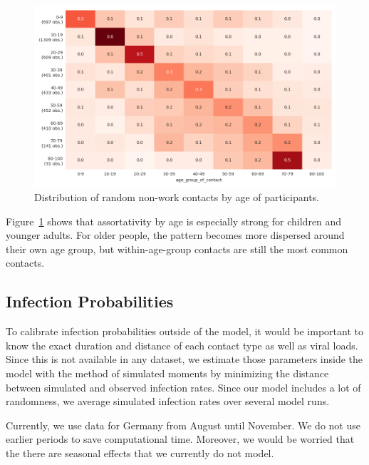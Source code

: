 \begin{figure}[ht]
    \centering
    \includegraphics[width=0.9 \textwidth]{../figures/assortative_matching_probability_example.png}
    \caption{Distribution of random non-work contacts by age of participants.}
    \label{fig:assortativity}
\end{figure}

Figure~\ref{fig:assortativity} shows that assortativity by age is especially strong for
children and younger adults. For older people, the pattern becomes more dispersed around
their own age group, but within-age-group contacts are still the most common contacts.

\FloatBarrier


\subsection{Infection Probabilities}
\label{sec:estimation}

To calibrate infection probabilities outside of the model, it would be important to know
the exact duration and distance of each contact type as well as viral loads. Since this
is not available in any dataset, we estimate those parameters inside the model with the
method of simulated moments \citep{McFadden1989} by minimizing the distance between
simulated and observed infection rates. Since our model includes a lot of randomness, we
average simulated infection rates over several model runs.

Currently, we use data for Germany from August until November. We do not use earlier
periods to save computational time. Moreover, we would be worried that the there are
seasonal effects that we currently do not model.

